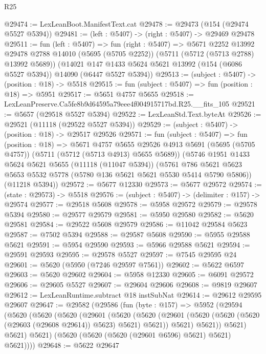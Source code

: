\begin{lexlean}{R25}
\begin{coremodule}
@29474 := LexLeanBoot.ManifestText.cat
@29478 := @29473 (@154 (@29474 @5527 @5394))
@29481 := (left : @5407) -> (right : @5407) -> @29469 @29478
@29511 := fun (left : @5407) =>
  fun (right : @5407) =>
  @5671
    @2252
    @13992
    @29478
    @2788
    @14010
    (@5695 (@5705 @2252))
    (@5711 (@5712 (@5713 @2788) @13992 @5689))
    (@14021 @147 @1433 @5624 @5621 @13992 (@154 (@6086 @5527 @5394)) @14090 (@6447 @5527 @5394))
@29513 := (subject : @5407) -> (position : @18) -> @5518
@29515 := fun (subject : @5407) => fun (position : @18) => @5951
@29517 := @5651 @4757 @5655
@29518 := LexLeanPreserve.Ca5fe8b9d64595a79eee4f004915717bd.R25.__fits_105
@29521 := @5657 (@29518 @5527 @5394)
@29522 := LexLeanStd.Text.byteAt
@29526 := @29521 (@11118 (@29522 @5527 @5394))
@29529 := (subject : @5407) -> (position : @18) -> @29517 @29526
@29571 := fun (subject : @5407) =>
  fun (position : @18) =>
  @5671
    @4757
    @5655
    @29526
    @4913
    @5691
    (@5695 (@5705 @4757))
    (@5711 (@5712 (@5713 @4913) @5655 @5689))
    (@5746
      @1951
      @1433
      @5624
      @5621
      @5655
      (@11118 (@11047 @5394))
      (@5761 @786 @5621 @5623 @5653 @5532 @5778 (@5780 @136 @5621 @5621 @5530 @5414 @5790 @5806))
      (@11218 @5394))
@29572 := @5677 @12330
@29573 := @5677 @29572
@29574 := (state : @29573) -> @5518
@29576 := (subject : @5407) -> (delimiter : @157) -> @29574
@29577 := @29518 @5608
@29578 := @5958 @29572
@29579 := @29578 @5394
@29580 := @29577 @29579
@29581 := @5950 @29580
@29582 := @5620 @29581
@29584 := @29522 @5608 @29579
@29586 := @11042 @29584 @5623
@29587 := @7502 @5394
@29588 := @29587 @5608
@29590 := @5955 @29588 @5621
@29591 := @5954 @29590
@29593 := @5966 @29588 @5621
@29594 := @29591 @29593
@29595 := @29578 @5527
@29597 := @7545 @29595 @24
@29601 := @5620 (@5950 (@7246 @29597 @7561))
@29602 := @5622 @6597
@29603 := @5620 @29602
@29604 := @5958 @12330
@29605 := @6091 @29572
@29606 := @29605 @5527
@29607 := @29604 @29606
@29608 := @9819 @29607
@29612 := LexLeanRuntime.subtract @18 instSubNat
@29614 := @29612 @29595 @29607
@29647 := @29582
    (@29586
      (fun (byte : @157) =>
      @5952
        (@29594
          (@5620
            (@5620
              (@5620
                (@29601
                  (@5620
                    (@5620
                      (@29601 (@5620 (@5620 (@5620 (@29603 (@29608 @29614)) @5623) @5621) @5621))
                      @5621)
                    @5621))
                @5621)
              @5621)
            @5621)
          (@5620 (@5620 (@5620 (@29601 @6596) @5621) @5621) @5621))))
@29648 := @5622 @29647

\end{coremodule}
\end{lexlean}
